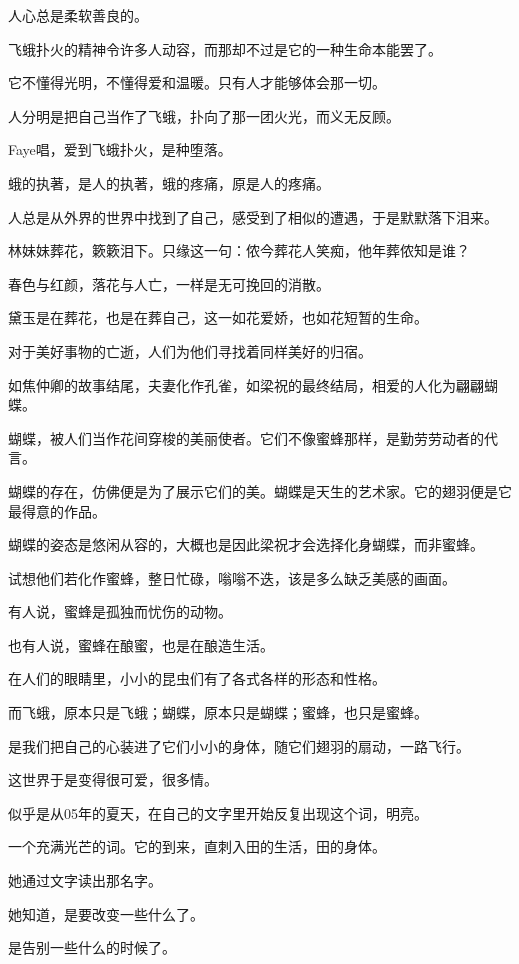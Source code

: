 		人心总是柔软善良的。

		飞蛾扑火的精神令许多人动容，而那却不过是它的一种生命本能罢了。\par
		它不懂得光明，不懂得爱和温暖。只有人才能够体会那一切。\par
		人分明是把自己当作了飞蛾，扑向了那一团火光，而义无反顾。\par
		Faye唱，爱到飞蛾扑火，是种堕落。\par
		蛾的执著，是人的执著，蛾的疼痛，原是人的疼痛。\par
		人总是从外界的世界中找到了自己，感受到了相似的遭遇，于是默默落下泪来。

		林妹妹葬花，簌簌泪下。只缘这一句：侬今葬花人笑痴，他年葬侬知是谁？\par
		春色与红颜，落花与人亡，一样是无可挽回的消散。\par
		黛玉是在葬花，也是在葬自己，这一如花爱娇，也如花短暂的生命。

		对于美好事物的亡逝，人们为他们寻找着同样美好的归宿。\par
		如焦仲卿的故事结尾，夫妻化作孔雀，如梁祝的最终结局，相爱的人化为翩翩蝴蝶。\par
		蝴蝶，被人们当作花间穿梭的美丽使者。它们不像蜜蜂那样，是勤劳劳动者的代言。\par
		蝴蝶的存在，仿佛便是为了展示它们的美。蝴蝶是天生的艺术家。它的翅羽便是它最得意的作品。\par
		蝴蝶的姿态是悠闲从容的，大概也是因此梁祝才会选择化身蝴蝶，而非蜜蜂。\par
		试想他们若化作蜜蜂，整日忙碌，嗡嗡不迭，该是多么缺乏美感的画面。

		有人说，蜜蜂是孤独而忧伤的动物。\par
		也有人说，蜜蜂在酿蜜，也是在酿造生活。\par
		在人们的眼睛里，小小的昆虫们有了各式各样的形态和性格。\par
		而飞蛾，原本只是飞蛾；蝴蝶，原本只是蝴蝶；蜜蜂，也只是蜜蜂。\par
		是我们把自己的心装进了它们小小的身体，随它们翅羽的扇动，一路飞行。\par
		这世界于是变得很可爱，很多情。

	\endwriting



		似乎是从05年的夏天，在自己的文字里开始反复出现这个词，明亮。\par
		一个充满光芒的词。它的到来，直刺入田的生活，田的身体。\par
		她通过文字读出那名字。\par
		她知道，是要改变一些什么了。\par
		是告别一些什么的时候了。

